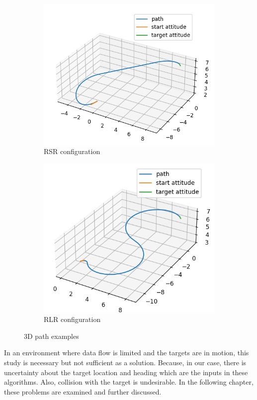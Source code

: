 \documentclass[12pt]{article}
\begin{document}
\begin{figure}
\centering
\begin{subfigure}{.5\linewidth}
  \includegraphics[width=.75\linewidth]{dubins3d_1.png}
  \caption{RSR configuration}
  \label{fig:Dpath1}
\end{subfigure}%
\begin{subfigure}{.5\linewidth}
  \includegraphics[width=.75\linewidth]{dubins3d_2.png}
  \caption{RLR configuration}
  \label{fig:Dpath2}
\end{subfigure}
\caption{3D path examples}
\label{fig:test}
\end{figure}
\FloatBarrier
\justify
In an environment where data flow is limited and the targets are in motion, this study is necessary but not sufficient as a solution. Because, in our case, there is uncertainty about the target location and heading which are the inputs in these algorithms. Also, collision with the target is undesirable. In the following chapter, these problems are examined and further discussed.
\end{document}
